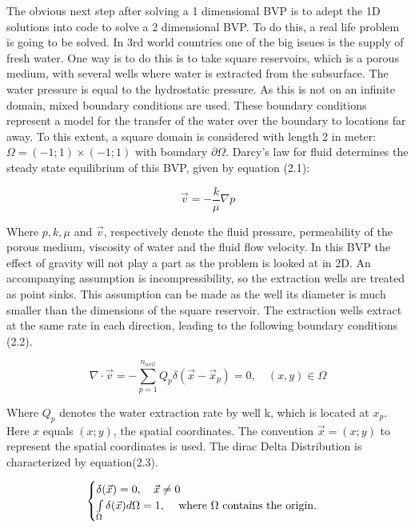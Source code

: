 \documentclass[a4paper]{report}
\begin{document}
The obvious next step after solving a 1 dimensional BVP is to adept the 1D solutions into code to solve a 2 dimensional BVP. To do this, a real life problem is going to be solved. In 3rd world countries one of the big issues is the supply of fresh water. One way is to do this is to take square reservoirs, which is a porous medium, with several wells where water is extracted from the subsurface. The water pressure is equal to the hydrostatic pressure. As this is not on an infinite domain, mixed boundary conditions are used. These boundary conditions represent a model for the transfer of the water over the boundary to locations far away. To this extent, a square domain is considered with length 2 in meter: $\Omega= (-1; 1) \times (-1; 1)$ with boundary $\partial\Omega$. Darcy's law for fluid determines the steady state equilibrium of this BVP, given by equation (2.1):

\begin{equation}
\vec{v}=-\frac{k}{\mu}\nabla p
\end{equation}
\medskip

Where $ p, k, \mu$ and $\vec{v}$, respectively denote the 
fluid pressure, permeability of the porous medium, viscosity of water and the fluid flow velocity. In this BVP the effect of gravity will not play a part as the problem is looked at in 2D. An accompanying assumption is incompressibility, so the extraction wells are treated as point sinks. This assumption can be made as the well its diameter is much smaller than the dimensions of the square reservoir. The extraction wells extract at the same rate in each direction, leading to the following boundary conditions (2.2).


\begin{equation}
	\nabla\cdot\vec{v}=-\sum_{p=1}^{n_{well}}Q_p\delta(\vec{x}-\vec{x}_p)=0,\quad (x,y) 	\in\Omega 
\end{equation}

Where $Q_p$ denotes the water extraction rate by well k, which is located at $x_p$. Here $x$ equals $(x;y)$, the spatial coordinates.  The convention $\vec{x} = (x; y) $ to represent the spatial coordinates is used. The dirac Delta Distribution is characterized by equation(2.3).

\begin{equation}
	\begin{cases} 
		\delta(\vec{x}) = 0,\quad  \vec{x} \neq 0 \\
		 \int\limits_{\Omega}\delta(\vec{x})d\Omega = 1, \quad $  where $\Omega $  contains the origin.$
	\end{cases} 
\end{equation}
\end{document}
